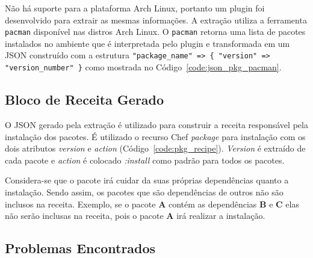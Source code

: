 Não há suporte para a plataforma Arch Linux, portanto um plugin foi desenvolvido
para extrair as mesmas informações. A extração utiliza a ferramenta \texttt{pacman} disponível
nas distros Arch Linux. O \texttt{pacman} retorna uma lista de pacotes instalados no ambiente
que é interpretada pelo plugin e transformada em um JSON construído com a estrutura
\texttt{"package\_name" => \{ "version" => "version\_number" \}} como mostrada no
Código~\ref{code:json_pkg_pacman}.

\noindent\begin{minipage}{\textwidth}
  \lstset{style=shell}
  
\end{minipage}\hfill

\subsection{Bloco de Receita Gerado}

O JSON gerado pela extração é utilizado para construir a receita responsável pela instalação dos
pacotes. É utilizado o recurso Chef \textit{package} para instalação com os dois atributos
\textit{version} e \textit{action} (Código~\ref{code:pkg_recipe}). \textit{Version}
é extraído de cada pacote e \textit{action} é colocado \textit{\textit{:install}} como padrão para todos os pacotes.

\noindent\begin{minipage}{\textwidth}
  \lstset{style=shell}
  
\end{minipage}\hfill

Considera-se que o pacote irá cuidar da suas próprias dependências quanto a instalação.
Sendo assim, os pacotes que são dependências de outros não são inclusos na receita. Exemplo, se o pacote
\textbf{A} contém as dependências \textbf{B} e \textbf{C} elas não serão inclusas na receita, pois o pacote \textbf{A} irá realizar a instalação.

\subsection{Problemas Encontrados}
